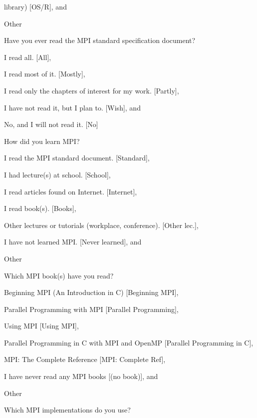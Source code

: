 \documentclass[preprint,5p,times]{elsarticle}
\begin{document}
{{\begin{description}
\begin{inparaenum}[{\bf C}1)]
      library) [OS/R], and
    \item Other
    \end{inparaenum}
  \item[Q9:] Have you ever read the MPI standard specification document?
    \begin{inparaenum}[{\bf C}1)]
    \item I read all. [All],
    \item I read most of it. [Mostly],
    \item I read only the chapters of interest for my work. [Partly],
    \item I have not read it, but I plan to. [Wish], and
    \item No, and I will not read it. [No]
    \end{inparaenum}
  \item[Q10*:] How did you learn MPI?
    \begin{inparaenum}[{\bf C}1)]
    \item I read the MPI standard document. [Standard],
    \item I had lecture(s) at school. [School],
    \item I read articles found on Internet. [Internet],
    \item I read book(s). [Books],
    \item Other lectures or tutorials (workplace, conference). [Other lec.],
    \item I have not learned MPI. [Never learned], and
    \item Other
    \end{inparaenum}
  \item[Q11*:] Which MPI book(s) have you read?
    \begin{inparaenum}[{\bf C}1)]
    \item Beginning MPI (An Introduction in C) [Beginning MPI],
    \item Parallel Programming with MPI [Parallel Programming],
    \item Using MPI [Using MPI],
    \item Parallel Programming in C with MPI and OpenMP [Parallel
      Programming in C],
    \item MPI: The Complete Reference [MPI: Complete Ref],
    \item I have never read any MPI books [(no book)], and
    \item Other
    \end{inparaenum}
  \item[Q12*:] Which MPI implementations do you use?

\end{description}}}
\end{document}
